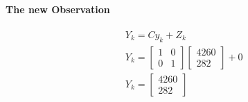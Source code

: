 \paragraph{The new Observation}
$$
\begin{aligned}
&Y_k=C y_k+Z_k \\
&Y_k=\left[\begin{array}{ll}
1 & 0 \\
0 & 1
\end{array}\right]\left[\begin{array}{c}
4260 \\
282
\end{array}\right]+0 \\
&Y_k=\left[\begin{array}{l}
4260 \\
282
\end{array}\right]
\end{aligned}
$$

